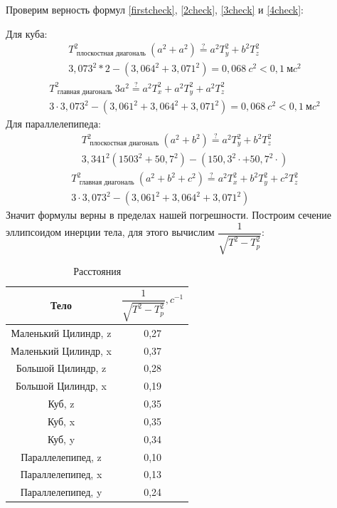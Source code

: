 Проверим верность формул \eqref{firstcheck}, \eqref{2check}, \eqref{3check} и \eqref{4check}:

Для куба: \begin{gather}
   T_ \text{ плоскостная диагональ }^2(a^2 + a^2) \overset{?}{=} a^2T_y^2 + b^2T_z^2 \\
   3,073^2*2 - (3,064^2 + 3,071^2) = 0,068~c^2 < 0,1~\text{м}c^2
\end{gather} \begin{gather}
   T_\text{ главная диагональ }^2 3a^2 \overset{?}{=} a^2 T_x^2 + a^2 T_y^2 + a^2 T_z^2 \\
   3 \cdot 3,073^2 - (3,061^2 + 3,064^2 + 3,071^2) = 0,068~c^2 < 0,1~\text{м}c^2
\end{gather}
Для параллелепипеда: \begin{gather}
   T_ \text{ плоскостная диагональ }^2(a^2 + b^2) \overset{?}{=} a^2T_y^2 + b^2T_z^2 \\
   3,341^2(1503^2 + 50,7^2) - (150,3^2 \cdot  + 50,7^2 \cdot ) 
\end{gather} \begin{gather}
   T_\text{ главная диагональ }^2 (a^2 + b^2 + c^2) \overset{?}{=} a^2 T_x^2 + b^2 T_y^2 + c^2 T_z^2 \\
   3 \cdot 3,073^2 - (3,061^2 + 3,064^2 + 3,071^2)
\end{gather}
Значит формулы верны в пределах нашей погрешности.
Построим сечение эллипсоидом инерции тела, для этого вычислим $ \dfrac{1}{\sqrt{T^2 - T_p^2}} $:
\begin{table}[!ht]
   \centering
   \caption{Расстояния}
   \begin{tabular}{|c|c|}
   \hline
      Тело & $ \dfrac{1}{\sqrt{T^2 - T_p^2}}, c^{-1} $ \\ \hline
       Маленький Цилиндр,  z & 0,27 \\ \hline
       Маленький Цилиндр,  x & 0,37 \\ \hline
       Большой Цилиндр, z & 0,28 \\ \hline
       Большой Цилиндр, x & 0,19 \\ \hline
       Куб, z & 0,35 \\ \hline
       Куб, x & 0,35 \\ \hline
       Куб, y & 0,34 \\ \hline
       Параллелепипед, z & 0,10 \\ \hline
       Параллелепипед, x & 0,13 \\ \hline
       Параллелепипед, y & 0,24 \\ \hline
   \end{tabular}
\end{table}
